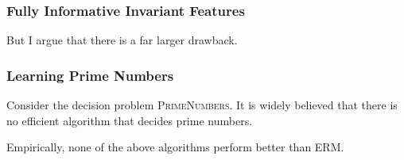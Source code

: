 \subsubsection{Fully Informative Invariant Features}
But I argue that there is a far larger drawback.
\subsubsection{Learning Prime Numbers}
Consider the decision problem \textsc{PrimeNumbers}.
It is widely believed that there is no efficient algorithm that decides prime numbers.

Empirically, none of the above algorithms perform better than ERM.
